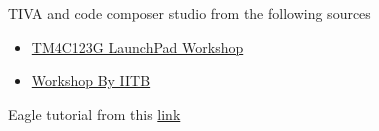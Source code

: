 \documentclass[a4paper,12pt,oneside]{book}
\begin{document}
\begin{thebibliography}{li}
	\item TIVA and code composer studio from the following sources 
	\begin{itemize}
		\item \href{https://www.google.co.in/url?sa=t\&rct=j\&q=\&esrc=s\&source=web\&cd=3\&sqi=2\&ved=0ahUKEwimtoeU5PHUAhWHpo8KHZmoCQ4QFgg1MAI\&url=https\%3A\%2F\%2Fwww.cse.iitb.ac.in\%2F~erts\%2Fhtml\_pages\%2FResources\%2FTiva\%2FTM4C123G_LaunchPad_Workshop_Workbook.pdf\&usg=AFQjCNGfuNP0-MWklzZhTATrZNd4aIE92Q\&cad=rja}{TM4C123G LaunchPad Workshop}
		\item \href{https://www.google.co.in/url?sa=t\&rct=j\&q=\&esrc=s\&source=web\&cd=4\&cad=rja\&uact=8\&sqi=2\&ved=0ahUKEwj3kvH15fHUAhXDtY8KHUVXAD8QFgg9MAM\&url=https\%3A\%2F\%2Fwww.cse.iitb.ac.in\%2F~erts\%2Fhtml\_pages\%2FResources\%2FTiva\%2FTM4C123G_LaunchPad_Workshop_Workbook.pdf\&usg=AFQjCNGfuNP0-MWklzZhTATrZNd4aIE92Q}{Workshop By IITB}
		\end{itemize}
	\item Eagle tutorial from this \href{https://www.youtube.com/watch?v=1AXwjZoyNno}{link} 
	
\end{thebibliography}
\end{document}

